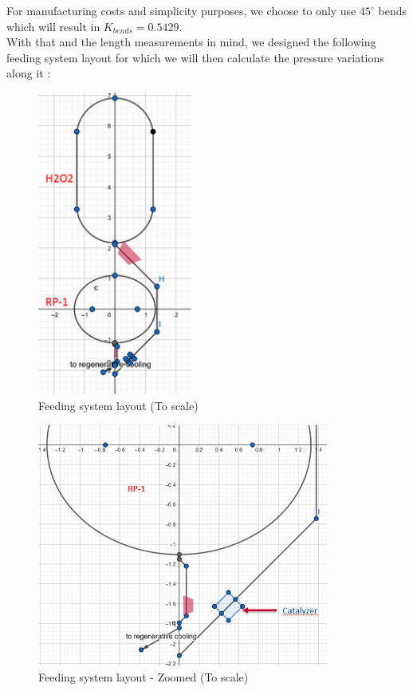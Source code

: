 For manufacturing costs and simplicity purposes, we choose to only use $45^\circ$ bends which will result in $K_{bends}=0.5429$.\\

With that and the length measurements in mind, we designed the following feeding system layout for which we will then calculate the pressure variations along it :
\begin{figure}[H]
	\centering
	\includegraphics[height=10cm]{feeding}
	\caption{Feeding system layout (To scale)}
\end{figure}
\begin{figure}[H]
	\centering
	\includegraphics[height=8cm]{feedingzoom}
	\caption{Feeding system layout - Zoomed (To scale)}
\end{figure}
